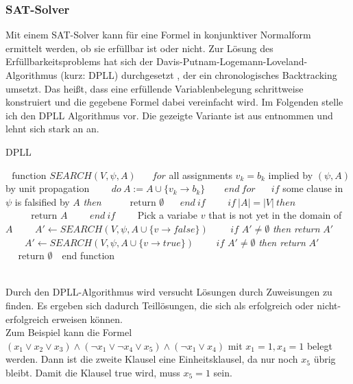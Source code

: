 \documentclass[a4,abstract=on]{scrartcl}
\begin{document}
\subsubsection{SAT-Solver}
Mit einem SAT-Solver kann für eine Formel in konjunktiver Normalform ermittelt werden, ob sie erfüllbar ist oder nicht. Zur Lösung des Erfüllbarkeitsproblems hat sich der Davis-Putnam-Logemann-Loveland-Algorithmus (kurz: DPLL) durchgesetzt \cite[vgl.][]{dpll}, der ein chronologisches Backtracking umsetzt. Das heißt, dass eine erfüllende Variablenbelegung schrittweise konstruiert und die gegebene Formel dabei vereinfacht wird. Im Folgenden stelle ich den DPLL Algorithmus vor. Die gezeigte Variante ist aus \cite[][]{algoDpll} entnommen und lehnt sich stark an \cite[][]{satisfiability} an.

\FloatBarrier
\begin{algorithm}[h]
\caption{DPLL}
\label{alg:dpll}
\begin{algorithmic}

\State $\text{~~function~}SEARCH(V,\psi,A) $
\State $\text{~~~~}for$ all assignments $v_k=b_k$ implied by $(\psi, A)$ by unit propagation 
\State $\text{~~~~~~}do {~}A:=A\cup\{v_k \rightarrow b_k\}$
\State $\text{~~~~ }end {~} for$
\State $\text{~~~~}if $ some clause in $\psi$ is falsified by $A$ \textit{then}
\State $\text{~~~~~~~~return } \emptyset$
\State $\text{~~~~}end {~} if$
\State $\text{~~~~~~}if {~} |A| = |V| {~} then$
\State $\text{~~~~~~~~return } A$
\State $\text{~~~~~~} end {~} if$
\State $\text{~~~~~~}$Pick a variabe $v$ that is not yet in the domain of $A$
\State $\text{~~~~~~} A' \leftarrow SEARCH(V,\psi,A\cup\{v \rightarrow false\})$
\State $\text{~~~~~~}if$ $A' \neq \emptyset$ \textit{then return} $A'$
\State $\text{~~~~~~}A' \leftarrow SEARCH(V,\psi, A \cup \{v \rightarrow true\})$
\State $\text{~~~~~~}if$ $A' \neq \emptyset$ \textit{then return} $A'$
\State $\text{~~~~return }\emptyset$
\State $\text{~~}$end function
\end{algorithmic}
\end{algorithm}
\FloatBarrier
\ \\
Durch den DPLL-Algorithmus wird versucht Lösungen durch Zuweisungen zu finden. Es ergeben sich dadurch Teillösungen, die sich als erfolgreich oder nicht-erfolgreich erweisen können. \\
Zum Beispiel kann die Formel $(x_1 \vee x_2 \vee x_3) \wedge (\neg x_1 \vee \neg x_4 \vee x_5) \wedge (\neg x_1 \vee x_4)$ mit $x_1=1, x_4=1$ belegt werden. Dann ist die zweite Klausel eine Einheitsklausel, da nur noch $x_5$ übrig bleibt. Damit die Klausel true wird, muss $x_5 = 1$ sein. \\
\end{document}

